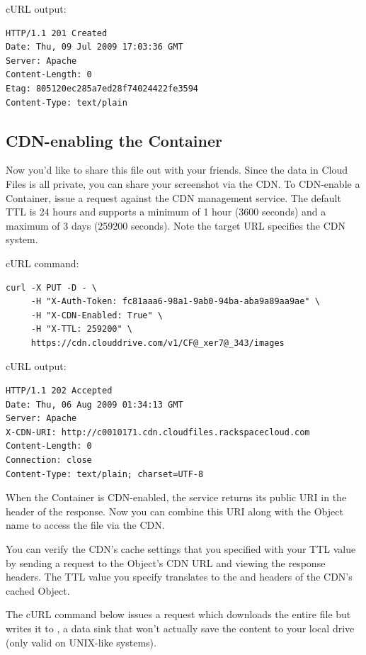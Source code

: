 \documentclass[letterpaper,10pt,english]{manual}
\begin{document}
cURL output:

\begin{Verbatim}[commandchars=@\[\]]
HTTP/1.1 201 Created
Date: Thu, 09 Jul 2009 17:03:36 GMT
Server: Apache
Content-Length: 0
Etag: 805120ec285a7ed28f74024422fe3594
Content-Type: text/plain
\end{Verbatim}


\subsection{CDN-enabling the Container}

Now you'd like to share this file out with your friends.  Since the data
in Cloud Files is all private, you can share your screenshot via the CDN.
To CDN-enable a Container, issue a  request against the CDN
management service.  The default TTL is 24 hours and supports a minimum
of 1 hour (3600 seconds) and a maximum of 3 days (259200 seconds).  Note
the target URL specifies the CDN system.

cURL command:

\begin{Verbatim}[commandchars=@\[\]]
curl -X PUT -D - \
     -H "X-Auth-Token: fc81aaa6-98a1-9ab0-94ba-aba9a89aa9ae" \
     -H "X-CDN-Enabled: True" \
     -H "X-TTL: 259200" \
     https://cdn.clouddrive.com/v1/CF@_xer7@_343/images
\end{Verbatim}

cURL output:

\begin{Verbatim}[commandchars=@\[\]]
HTTP/1.1 202 Accepted
Date: Thu, 06 Aug 2009 01:34:13 GMT
Server: Apache
X-CDN-URI: http://c0010171.cdn.cloudfiles.rackspacecloud.com
Content-Length: 0
Connection: close
Content-Type: text/plain; charset=UTF-8
\end{Verbatim}

When the Container is CDN-enabled, the service returns its public URI
in the \code{X-CDN-URI} header of the response.  Now you can combine this
URI along with the Object name to access the file via the CDN.

You can verify the CDN's cache settings that you specified with your TTL
value by sending a  request to the Object's CDN URL and viewing the
response headers.  The TTL value you specify translates to the 
and  headers of the CDN's cached Object.

The cURL command below issues a \code{GET} request which downloads the
entire file but writes it to \code{/dev/null}, a data sink that won't
actually save the content to your local drive (only valid on UNIX-like
systems).
\end{document}
